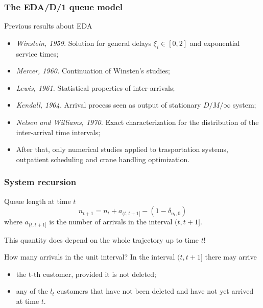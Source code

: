 \documentclass[table,aspectratio=169]{beamer}
\begin{document}
\begin{frame}[t]\frametitle{The EDA/D/1 queue model}
    \begin{exampleblock}{Previous results about EDA}
        \begin{itemize}
            \item \emph{Winstein, 1959.} Solution for general delays $\xi_i \in [0,2]$ and exponential service times;
            \item \emph{Mercer, 1960.} Continuation of Winsten's studies;
            \item \emph{Lewis, 1961.} Statistical properties of inter-arrivals;
            \item \emph{Kendall, 1964.} Arrival process seen as output of stationary $D/M/\infty$ system;
            \item \emph{Nelsen and Williams, 1970.} Exact characterization for the distribution of
            the inter-arrival time intervals;
            \item After that, only numerical studies applied to trasportation systems, outpatient scheduling and crane handling optimization.
        \end{itemize}
    \end{exampleblock}
\end{frame}

\begin{frame}[t]\frametitle{System recursion}
    \begin{block}{Queue length at time $t$}
        \[n_{t+1}= n_t + a_{(t,t+1]} -(1-\delta_{n_t,0})\]
        where $a_{(t,t+1]}$ is the number of arrivals in the interval $(t,t+1]$.
        \begin{center}
            \alert{This quantity does depend on the whole trajectory up to
            time $t$!}
        \end{center}
    \end{block}
    \begin{block}{How many arrivals in the unit interval?}
        In the interval $(t,t+1]$ there may arrive
        \begin{itemize}
            \item the t-th customer, provided it is not deleted;
            \item any of the $l_t$ customers that have not been deleted and have
            not yet arrived at time $t$.
        \end{itemize}
    \end{block}
\end{frame}
\end{document}
